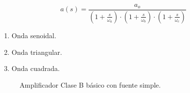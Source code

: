 


\begin{equation}
\label{eq:1}
a(s) = \frac{a_o}{(1+\frac{s}{\omega_a})\cdot (1+\frac{s}{\omega_b})\cdot (1+\frac{s}{\omega_c})} 
\end{equation}

\begin{enumerate}
\item Onda senoidal.
\item Onda triangular.
\item Onda cuadrada.
\end{enumerate}       %


\begin{figure}[h]
\centering
{}
\caption{Amplificador Clase B básico con fuente simple.}
\label{1.0}
\end{figure}
